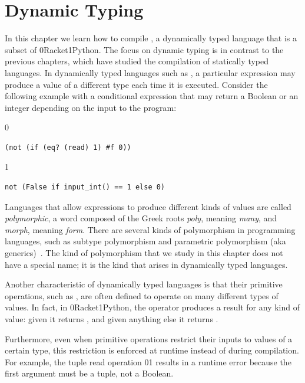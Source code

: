 \documentclass[7x10]{TimesAPriori_MIT}%
\def\racketEd{0}
\def\pythonEd{1}
\def\edition{1}
\newcommand{\racket}[1]{{\if\edition\racketEd{#1}\fi}}
\newcommand{\pythonColor}[0]{}
\newcommand{\python}[1]{{\if\edition\pythonEd\pythonColor #1\fi}}
\numberwithin{theorem}{chapter}
\numberwithin{definition}{chapter}
\numberwithin{equation}{chapter}
\begin{document}

\chapter{Dynamic Typing}
\label{ch:Ldyn}
\setcounter{footnote}{0}

In this chapter we learn how to compile \LangDyn{}, a dynamically
typed language that is a subset of \racket{Racket}\python{Python}. The
focus on dynamic typing is in contrast to the previous chapters, which
have studied the compilation of statically typed languages. In
dynamically typed languages such as \LangDyn{}, a particular
expression may produce a value of a different type each time it is
executed. Consider the following example with a conditional 
expression that may return a Boolean or an integer depending on the
input to the program:
{\if\edition\racketEd
\begin{lstlisting}
(not (if (eq? (read) 1) #f 0))
\end{lstlisting}
\fi}
{\if\edition\pythonEd\pythonColor
\begin{lstlisting}
not (False if input_int() == 1 else 0)
\end{lstlisting}
\fi}

Languages that allow expressions to produce different kinds of values
are called \emph{polymorphic}, a word composed of the Greek roots
\emph{poly}, meaning \emph{many}, and \emph{morph}, meaning \emph{form}.
There are several kinds of polymorphism in programming languages, such as
subtype polymorphism and
parametric polymorphism
(aka generics)~\citep{Cardelli:1985kx}. The kind of polymorphism that we
study in this chapter does not have a special name; it is the kind
that arises in dynamically typed languages.

Another characteristic of dynamically typed languages is that
their primitive operations, such as , are often defined to operate
on many different types of values.  In fact, in
\racket{Racket}\python{Python}, the  operator produces a
result for any kind of value: given \FALSE{} it returns \TRUE{}, and
given anything else it returns \FALSE{}.

Furthermore, even when primitive operations restrict their inputs to
values of a certain type, this restriction is enforced at runtime
instead of during compilation. For example, the tuple read
operation \racket{}\python{}
results in a runtime error because the first argument must
be a tuple, not a Boolean.
\end{document}
